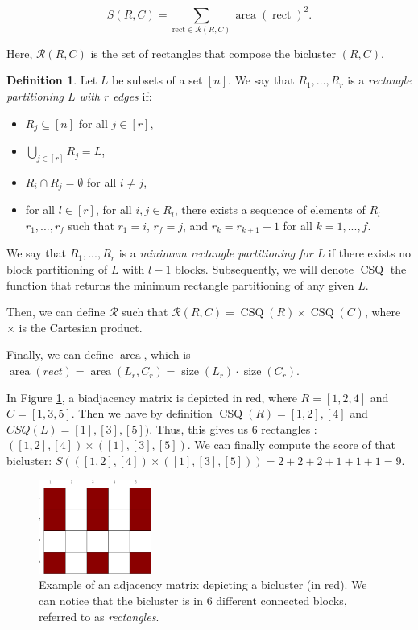 \documentclass[twoside,leqno,twocolumn]{article}
\theoremstyle{definition}
\newtheorem{definition}{Definition}[section]
\begin{document}
$$
S(R,C) = \sum_{\text{rect}\in \mathcal{R}(R,C)} \operatorname{area}(\operatorname{rect})^2.
$$

\medskip

\noindent  Here, $\mathcal{R}(R,C)$ is the set of rectangles that compose the bicluster $(R,C)$.
\begin{definition}
\label{def:rect}
Let $L$ be subsets of a set $[n]$. We say that $R_1,...,R_r$ is a \emph{rectangle partitioning $L$ with $r$ edges} if:
\begin{itemize}
\item  $R_j \subseteq [n]$ for all $j \in [r]$,
\item $\bigcup_{j \in [r]} R_j = L$,
\item $R_i \cap R_j = \emptyset$ for all $i \neq j$,
\item for all $l \in [r]$, for all $i,j \in R_l$, there exists a sequence of elements of $R_l$ $r_1,...,r_f$ such that $r_1=i$, $r_f=j$, and $r_k=r_{k+1}+1$ for all $k=1,...,f$.
\end{itemize}
\end{definition}

 \noindent We say that $R_1,...,R_r$ is a \emph{minimum rectangle partitioning for $L$} if there exists no block partitioning of $L$ with $l-1$ blocks. Subsequently, we will denote $\operatorname{CSQ}$ the function that returns the minimum rectangle partitioning of any given $L$.

 \medskip
 \noindent Then, we can define $\mathcal{R}$ such that $\mathcal{R}(R,C) = \operatorname{CSQ}(R) \times \operatorname{CSQ}(C)$, where $\times$ is the Cartesian product.

 \medskip

 \noindent Finally, we can define $\operatorname{area}$, which is $\operatorname{area}(rect)=\operatorname{area}(L_r,C_r) = \operatorname{size}(L_r)\cdot \operatorname{size}(C_r)$.


In Figure \ref{fig:clusterArea}, a biadjacency matrix is depicted in red, where $R=[1,2,4]$ and $C=[1,3,5]$. Then we have by definition $\operatorname{CSQ}(R) =[1,2],[4]$ and $CSQ(L) = [1],[3],[5])$. Thus, this gives us 6 rectangles : $([1,2],[4]) \times ([1],[3],[5])$. We can finally compute the score of that bicluster: $S(([1,2],[4]) \times ([1],[3],[5]))= 2 + 2 + 2 + 1 + 1 + 1 = 9.$
\begin{figure}
    \centering
    \includegraphics[width=0.33\textwidth]{figures/clusterArea.eps}
    \caption{Example of an adjacency matrix depicting a bicluster (in red). We can notice that the bicluster is in 6 different connected blocks, referred to as \emph{rectangles}.}
    \label{fig:clusterArea}
\end{figure}
\medskip
\end{document}
